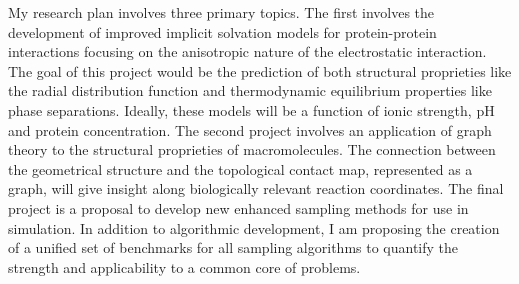 \documentclass[]{scrartcl}
\begin{document}
\begin{cleanCV}
\vspace{2em}

My research plan involves three primary topics. 
The first involves the development of improved implicit solvation models for protein-protein interactions focusing on the anisotropic nature of the electrostatic interaction.
The goal of this project would be the prediction of both structural proprieties like the radial distribution function and thermodynamic equilibrium properties like phase separations. 
Ideally, these models will be a function of ionic strength, pH and protein concentration.
The second project involves an application of graph theory to the structural proprieties of macromolecules.
The connection between the geometrical structure and the topological contact map, represented as a graph, will give insight along biologically relevant reaction coordinates.
The final project is a proposal to develop new enhanced sampling methods for use in simulation.
In addition to algorithmic development, I am proposing the creation of a unified set of benchmarks for all sampling algorithms to quantify the strength and applicability to a common core of problems.
\end{cleanCV}
\newpage
\end{document}
